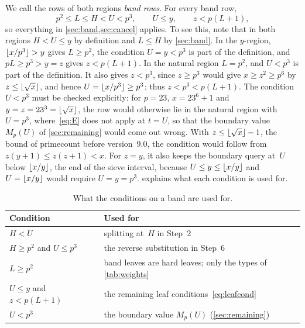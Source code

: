 \documentclass[11pt,a4paper]{amsart}
\numberwithin{equation}{section}
\DeclarePairedDelimiter{\floor}{\lfloor}{\rfloor}
\begin{document}
We call the rows of both regions \emph{band rows}. For every band row,
\begin{equation}\label{eq:window}
  p^2\le L\le H<U<p^3,\qquad U\le y,\qquad z<p(L+1),
\end{equation}
so everything in \cref{sec:band,sec:cancel} applies. To see this, note that in
both regions $H<U\le y$ by definition and $L\le H$ by \cref{sec:band}. In the
$y$-region, $\floor{x/p^3}>y$ gives $L\ge p^2$, the condition $U=y<p^3$ is part
of the definition, and $pL\ge p^3>y=z$ gives $z<p(L+1)$. In the natural region
$L=p^2$, and $U<p^3$ is part of the definition. It also gives $z<p^3$, since
$z\ge p^3$ would give $x\ge z^2\ge p^6$ by $z\le\floor{\sqrt x}$, and hence
$U=\floor{x/p^3}\ge p^3$; thus $z<p^3<p(L+1)$. The condition $U<p^3$ must be
checked explicitly: for $p=23$, $x=23^6+1$ and $y=z=23^3=\floor{\sqrt x}$, the
row would otherwise lie in the natural region with $U=p^3$, where~\eqref{eq:E}
does not apply at $t=U$, so that the boundary value $M_p(U)$ of
\cref{sec:remaining} would come out wrong. With $z\le\floor{\sqrt x}-1$, the
bound of primecount before version~9.0, the condition would follow from
$z(y+1)\le z(z+1)<x$. For $z=y$, it also keeps the boundary query at~$U$ below
$\floor{x/y}$, the end of the sieve interval, because $U\le y\le\floor{x/y}$
and $U=\floor{x/y}$ would require $U=y=p^3$.  explains what each
condition is used for.

\begin{table}[htb]
\caption{What the conditions on a band are used for.}\label{tab:hyp}
\centering
\begin{tabular}{@{}ll@{}}
\toprule
Condition & Used for\\
\midrule
$H<U$ & splitting at~$H$ in Step~2\\
$H\ge p^2$ and $U\le p^3$ & the reverse substitution in Step~6\\
$L\ge p^2$ & band leaves are hard leaves; only the types of \cref{tab:weights}\\
$U\le y$ and $z<p(L+1)$ & the remaining leaf conditions~\eqref{eq:leafcond}\\
$U<p^3$ & the boundary value $M_p(U)$ (\cref{sec:remaining})\\
\bottomrule
\end{tabular}
\end{table}
\end{document}
